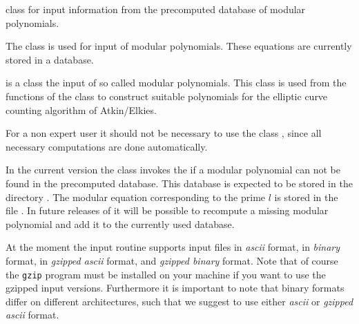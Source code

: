 

\NAME

 \dotfill class for input information from the precomputed database of modular
polynomials.



\ABSTRACT

The class  is used for input of modular polynomials.  These equations are
currently stored in a database.



\DESCRIPTION

 is a class the input of so called modular polynomials.  This class is used from
the functions of the class  to construct suitable polynomials for the elliptic
curve counting algorithm of Atkin/Elkies.

For a non expert user it should not be necessary to use the class , since all
necessary computations are done automatically.

In the current version the class  invokes the \LEH if a modular polynomial can
not be found in the precomputed database.  This database is expected to be stored in the
directory .  The modular equation corresponding to the
prime $l$ is stored in the file .  In future releases of  it
will be possible to recompute a missing modular polynomial and add it to the currently used
database.

At the moment the input routine supports input files in \emph{ascii} format, in \emph{binary}
format, in \emph{gzipped ascii} format, and \emph{gzipped binary} format.  Note that of course
the \texttt{gzip} program must be installed on your machine if you want to use the gzipped input
versions.  Furthermore it is important to note that binary formats differ on different
architectures, such that we suggest to use either \emph{ascii} or \emph{gzipped ascii} format.



